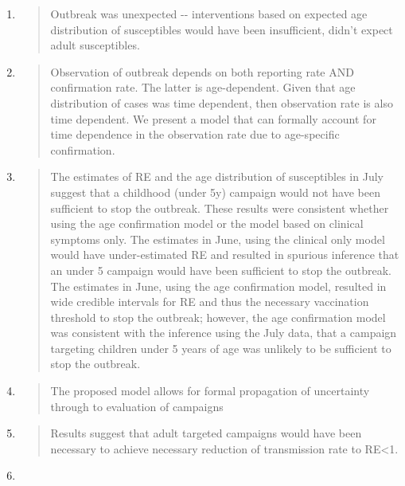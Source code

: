 \begin{enumerate}
\def\labelenumi{\arabic{enumi}.}
\item
  \begin{quote}
  Outbreak was unexpected -\/- interventions based on expected age
  distribution of susceptibles would have been insufficient, didn't
  expect adult susceptibles.
  \end{quote}
\item
  \begin{quote}
  Observation of outbreak depends on both reporting rate AND
  confirmation rate. The latter is age-dependent. Given that age
  distribution of cases was time dependent, then observation rate is
  also time dependent. We present a model that can formally account for
  time dependence in the observation rate due to age-specific
  confirmation.
  \end{quote}
\item
  \begin{quote}
  The estimates of RE and the age distribution of susceptibles in July
  suggest that a childhood (under 5y) campaign would not have been
  sufficient to stop the outbreak. These results were consistent whether
  using the age confirmation model or the model based on clinical
  symptoms only. The estimates in June, using the clinical only model
  would have under-estimated RE and resulted in spurious inference that
  an under 5 campaign would have been sufficient to stop the outbreak.
  The estimates in June, using the age confirmation model, resulted in
  wide credible intervals for RE and thus the necessary vaccination
  threshold to stop the outbreak; however, the age confirmation model
  was consistent with the inference using the July data, that a campaign
  targeting children under 5 years of age was unlikely to be sufficient
  to stop the outbreak.
  \end{quote}
\item
  \begin{quote}
  The proposed model allows for formal propagation of uncertainty
  through to evaluation of campaigns
  \end{quote}
\item
  \begin{quote}
  Results suggest that adult targeted campaigns would have been
  necessary to achieve necessary reduction of transmission rate to
  RE\textless{}1.
  \end{quote}
\item
  \begin{quote}

\end{quote}
\end{enumerate}
